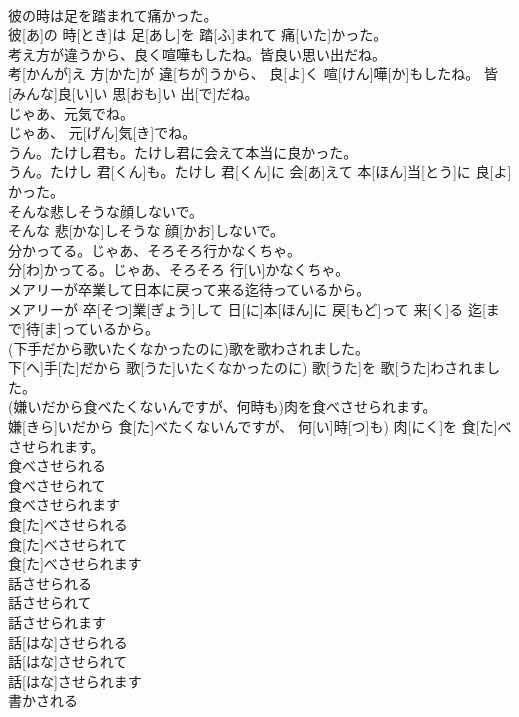 \documentclass[8pt]{extreport}
\begin{document}
\begin{CJK}{UTF8}{min}
\\	彼の時は足を踏まれて痛かった。	
\\	彼[あ]の 時[とき]は 足[あし]を 踏[ふ]まれて 痛[いた]かった。
\\	考え方が違うから、良く喧嘩もしたね。皆良い思い出だね。	
\\	考[かんが]え 方[かた]が 違[ちが]うから、 良[よ]く 喧[けん]嘩[か]もしたね。 皆[みんな]良[い]い 思[おも]い 出[で]だね。
\\	じゃあ、元気でね。	
\\	じゃあ、 元[げん]気[き]でね。
\\	うん。たけし君も。たけし君に会えて本当に良かった。	
\\	うん。たけし 君[くん]も。たけし 君[くん]に 会[あ]えて 本[ほん]当[とう]に 良[よ]かった。
\\	そんな悲しそうな顔しないで。	
\\	そんな 悲[かな]しそうな 顔[かお]しないで。
\\	分かってる。じゃあ、そろそろ行かなくちゃ。	
\\	分[わ]かってる。じゃあ、そろそろ 行[い]かなくちゃ。
\\	メアリーが卒業して日本に戻って来る迄待っているから。	
\\	メアリーが 卒[そつ]業[ぎょう]して 日[に]本[ほん]に 戻[もど]って 来[く]る 迄[まで]待[ま]っているから。
\\	(下手だから歌いたくなかったのに)歌を歌わされました。	
\\	下[へ]手[た]だから 歌[うた]いたくなかったのに) 歌[うた]を 歌[うた]わされました。
\\	(嫌いだから食べたくないんですが、何時も)肉を食べさせられます。	
\\	嫌[きら]いだから 食[た]べたくないんですが、 何[い]時[つ]も) 肉[にく]を 食[た]べさせられます。 
\\	食べさせられる 
\\	食べさせられて 
\\	食べさせられます	
\\	食[た]べさせられる 
\\	食[た]べさせられて 
\\	食[た]べさせられます
\\	話させられる 
\\	話させられて 
\\	話させられます	
\\	話[はな]させられる 
\\	話[はな]させられて 
\\	話[はな]させられます
\\	書かされる 

\end{CJK}
\end{document}
